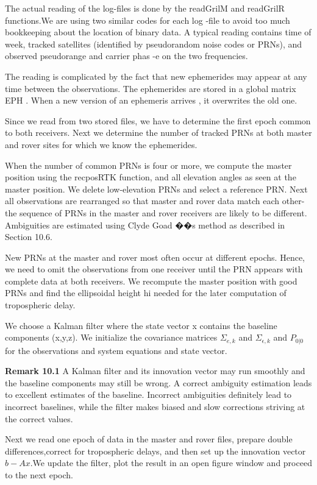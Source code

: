 The actual reading of the log-files is done by the readGrilM and readGrilR functions.We are using two similar codes for each log -file to avoid too much bookkeeping about the location of binary data. A typical reading contains time of week, tracked satellites (identified by pseudorandom noise codes or PRNs), and observed pseudorange and carrier phas -e on the two frequencies.

The reading is complicated by the fact that new ephemerides may appear at any time between the observations. The ephemerides are stored in a global matrix EPH . When a new version of an ephemeris arrives , it overwrites the old one.

Since we read from two stored files, we have to determine the first epoch common to both receivers. Next we determine the number of tracked PRNs at both master and rover sites for which we know the ephemerides.

When the number of common PRNs is four or more, we compute the master position using the recposRTK function, and all elevation angles as seen at the master position. We delete low-elevation PRNs and select a reference PRN. Next all observations are rearranged so that master and rover data match each other-the sequence of PRNs in the master and rover receivers are likely to be different. Ambiguities are estimated using Clyde Goad ��s method as described in Section 10.6.

New PRNs at the master and rover most often occur at different epochs. Hence, we need to omit the observations from one receiver until the PRN appears with complete data at both receivers. We recompute the master position with good PRNs and find the ellipsoidal height hi needed for the later computation of tropospheric delay.

We choose a Kalman filter where the state vector x contains the baseline components (x,y,z). We initialize the covariance matrices $\Sigma_{e,k}$ and $\Sigma_{\epsilon,k}$ and $P_{0|0}$ for the observations and system equations and state vector.

\textbf{Remark 10.1} A Kalman filter and its innovation vector may run smoothly and the baseline components may still be wrong. A correct ambiguity estimation leads to excellent estimates of the baseline. Incorrect ambiguities definitely lead to incorrect baselines, while the filter makes biased and slow corrections striving at the correct values.

Next we read one epoch of data in the master and rover files, prepare double differences,correct for tropospheric delays, and then set up the innovation vector $b-Ax$.We update the filter, plot the result in an open figure window and proceed to the next epoch.

